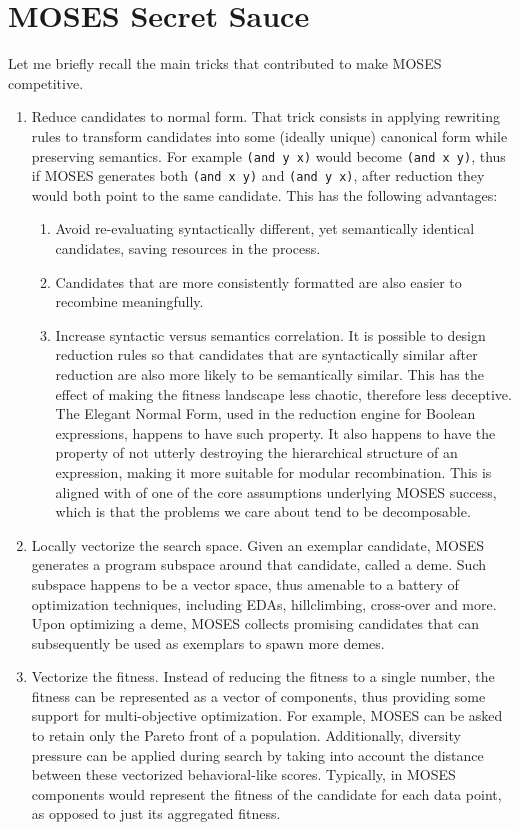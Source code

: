 \documentclass[]{report}
\begin{document}
\section{MOSES Secret Sauce}

Let me briefly recall the main tricks that contributed to make MOSES
competitive.

\begin{enumerate}
\item Reduce candidates to normal form.  That trick consists in
  applying rewriting rules to transform candidates into some (ideally
  unique) canonical form while preserving semantics.  For example
  \texttt{(and y x)} would become
  \texttt{(and x y)}, thus if MOSES generates both
  \texttt{(and x y)} and
  \texttt{(and y x)},
  after reduction they would both point to the same candidate.  This
  has the following advantages:
\begin{enumerate}
\item Avoid re-evaluating syntactically different, yet semantically
  identical candidates, saving resources in the process.
\item Candidates that are more consistently formatted are also easier
  to recombine meaningfully.
\item Increase syntactic versus semantics correlation.  It is possible
  to design reduction rules so that candidates that are syntactically
  similar after reduction are also more likely to be semantically
  similar.  This has the effect of making the fitness landscape less
  chaotic, therefore less deceptive.  The Elegant Normal Form, used in
  the reduction engine for Boolean expressions, happens to have such
  property.  It also happens to have the property of not utterly
  destroying the hierarchical structure of an expression, making it
  more suitable for modular recombination.  This is aligned with of
  one of the core assumptions underlying MOSES success, which is that
  the problems we care about tend to be decomposable.
\end{enumerate}
\item Locally vectorize the search space.  Given an exemplar
  candidate, MOSES generates a program subspace around that candidate,
  called a deme.  Such subspace happens to be a vector space, thus
  amenable to a battery of optimization techniques, including EDAs,
  hillclimbing, cross-over and more.  Upon optimizing a deme, MOSES
  collects promising candidates that can subsequently be used as
  exemplars to spawn more demes.
\item Vectorize the fitness.  Instead of reducing the fitness to a
  single number, the fitness can be represented as a vector of
  components, thus providing some support for multi-objective
  optimization.  For example, MOSES can be asked to retain only the
  Pareto front of a population.  Additionally, diversity pressure can
  be applied during search by taking into account the distance between
  these vectorized behavioral-like scores.  Typically, in MOSES
  components would represent the fitness of the candidate for each
  data point, as opposed to just its aggregated fitness.
\end{enumerate}
\end{document}
